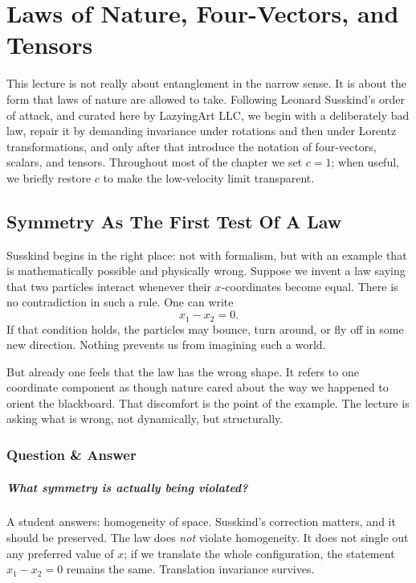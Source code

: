 \chapter{Laws of Nature, Four-Vectors, and Tensors}

This lecture is not really about entanglement in the narrow sense. It is about the form that laws of nature are allowed to take. Following Leonard Susskind's order of attack, and curated here by LazyingArt LLC, we begin with a deliberately bad law, repair it by demanding invariance under rotations and then under Lorentz transformations, and only after that introduce the notation of four-vectors, scalars, and tensors. Throughout most of the chapter we set \(c=1\); when useful, we briefly restore \(c\) to make the low-velocity limit transparent.

\section{Symmetry As The First Test Of A Law}

Susskind begins in the right place: not with formalism, but with an example that is mathematically possible and physically wrong. Suppose we invent a law saying that two particles interact whenever their \(x\)-coordinates become equal. There is no contradiction in such a rule. One can write
\begin{equation}
x_1-x_2=0.
\end{equation}
If that condition holds, the particles may bounce, turn around, or fly off in some new direction. Nothing prevents us from imagining such a world.

But already one feels that the law has the wrong shape. It refers to one coordinate component as though nature cared about the way we happened to orient the blackboard. That discomfort is the point of the example. The lecture is asking what is wrong, not dynamically, but structurally.

\subsection{Question \& Answer}

\paragraph{What symmetry is actually being violated?}

A student answers: homogeneity of space. Susskind's correction matters, and it should be preserved. The law does \emph{not} violate homogeneity. It does not single out any preferred value of \(x\); if we translate the whole configuration, the statement \(x_1-x_2=0\) remains the same. Translation invariance survives.

